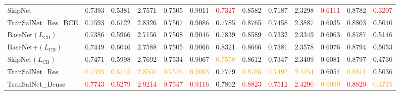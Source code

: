 \documentclass{article}
\begin{document}
\begin{table*}[]
{\begin{tabular}{l|cccccc|cccccc}
SkipNet  &0.7393& 0.5381& \multicolumn{1}{c|}{2.7571} &0.7505& 0.9011& \textcolor{red}{0.7327}& 0.8582&0.7187& \multicolumn{1}{c|}{2.3298} &\textcolor{red}{0.6111}&0.8782& \textcolor{red}{0.3207} \\



TranSalNet\_Res\_BCE  &0.7593& 0.6122& \multicolumn{1}{c|}{ 2.8326} &0.7507&0.9086& 0.7785&0.8765& 0.7458& \multicolumn{1}{c|}{2.3887} &0.6035& 0.8803& 0.5040 \\

BaseNet$(L_{\text{CB}})$ &0.7386  &0.5966 & \multicolumn{1}{c|}{2.7156 } &0.7508 &0.9046 &0.7839 &0.8589 &0.7332 & \multicolumn{1}{c|}{2.3349 } &0.6063 &0.8787 &0.5146 \\

BaseNet+$(L_{\text{CB}})$ &0.7449&0.6046& \multicolumn{1}{c|}{2.7588 } &0.7505 & 0.9066 & 0.8321 & 0.8666 &0.7381 & \multicolumn{1}{c|}{2.3578 } &0.6076 &0.8794 &0.5053  \\

SkipNet$(L_{\text{CB}})$ &0.7471 & 0.5998 & \multicolumn{1}{c|}{2.7692 } &0.7534 & 0.9067 & \textcolor{orange}{0.7558} & 
0.8612  &0.7347 & \multicolumn{1}{c|}{2.3409} &0.6081 &0.8797 & 0.4730 \\

TranSalNet\_Res &\textcolor{orange}{0.7595}&\textcolor{orange}{0.6145}& \multicolumn{1}{c|}{\textcolor{orange}{2.8501}} &\textcolor{orange}{0.7546}&\textcolor{orange}{0.9093}& 0.7779& \textcolor{orange}{0.8786}& \textcolor{orange}{0.7492}& \multicolumn{1}{c|}{\textcolor{orange}{2.4154}} &0.6054&\textcolor{orange}{0.8811}& 0.5036\\ 

TranSalNet\_Dense &\textcolor{red}{0.7743}&\textcolor{red}{0.6279}& \multicolumn{1}{c|}{\textcolor{red}{2.9214}} &\textcolor{red}{0.7547}&\textcolor{red}{0.9116}& 0.7862& \textcolor{red}{0.8823}& \textcolor{red}{0.7512}& \multicolumn{1}{c|}{\textcolor{red}{2.4290}} &\textcolor{orange}{0.6099}&\textcolor{red}{0.8820}& \textcolor{orange}{0.4715}\\
\bottomrule
\end{tabular}\label{tb:ab_study}
}
\end{table*}
\end{document}

